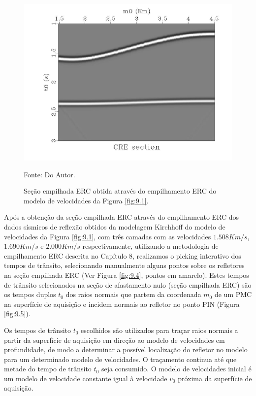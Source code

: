 \begin{figure}[H]
\caption{Seção empilhada ERC obtida através do empilhamento ERC
do modelo de velocidades da Figura \ref{fig:9.1}.}
\begin{center}
\includegraphics[scale=0.3]{images/stacked.jpeg}
\vspace{-0.3cm}
\end{center}
\begin{center}
 Fonte: Do Autor.
\end{center}
\label{fig:9.3}
\end{figure}

Após a obtenção da seção empilhada ERC através do empilhamento ERC dos dados sísmicos de reflexão
obtidos da modelagem Kirchhoff do modelo de velocidades da Figura \ref{fig:9.1},
com três camadas com as velocidades $1.508Km/s$, $1.690Km/s$ e $2.000Km/s$ respectivamente,
utilizando a metodologia de empilhamento ERC descrita no Capítulo 8,
realizamos o picking interativo dos tempos de trânsito, selecionando manualmente alguns
pontos sobre os refletores na seção empilhada ERC
(Ver Figura \ref{fig:9.4}, pontos em amarelo).
Estes tempos de trânsito selecionados na seção de afastamento nulo (seção empilhada ERC)
são os tempos duplos $t_0$ dos raios normais que partem da coordenada $m_0$
de um PMC na superfície de aquisição e incidem normais ao refletor no ponto PIN (Figura \ref{fig:9.5}).

Os tempos de trânsito $t_0$ escolhidos são utilizados para traçar raios normais
a partir da superfície de aquisição em direção ao modelo de velocidades
em profundidade,
de modo a determinar a possível localização do refletor no modelo
para um determinado modelo de velocidades.
O traçamento continua até que metade do tempo de trânsito $t_0$ seja consumido.
O modelo de velocidades inicial é um modelo de velocidade constante igual à velocidade $v_0$
próxima da superfície de aquisição.


